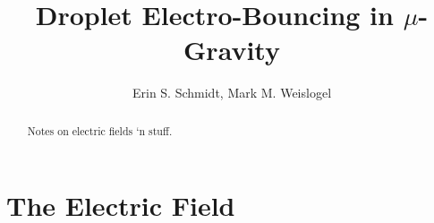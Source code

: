 \documentclass[a4paper, 12pt]{article}
\title{\textsf{\textbf{Droplet Electro-Bouncing in $\mu$-Gravity}}}
\author{Erin S. Schmidt, Mark M. Weislogel}
\date{}
\begin{document}
\maketitle

\begin{abstract}
\noindent
Notes on electric fields `n stuff.
\end{abstract}
\doublespacing
\section{The Electric Field}
\begin{comment}
Being thus armed with the assumption of a purely electrostatic problem (the electric field is conservative, that is $\nabla \times \mathbf{E} = 0$, where $\mathbf{E}$ is the electric field) we can describe the electric field by the Laplace equation for the electric potential. In the case of the volume charge density of the bulk medium to being zero, the divergence of the electric field is zero and we have

\begin{eqnarray}
\mathbf{E} &=& -\nabla \varphi \\
\nabla \cdot \mathbf{E} &=& 0\\
\nabla \cdot \mathbf{E} &=& - \nabla \cdot \nabla \varphi = \nabla^2 \varphi = 0,
\end{eqnarray}
it being convenient to solve the field in terms to $\varphi$ due to the form of the \emph{boundary conditions} usually given by
\begin{enumerate}
\item For finite charge distributions, the potential $\varphi$ goes to zero at infinity, is constant throughout a conductors, and is continuous across physical boundaries.
\item The normal component of the displacement vector $\mathbf{D}$, differs on two sides of a boundary by the free charge density $\rho_f$ residing on the boundary.
\item The tangential component of the field intensity $\mathbf{E}$ is continuous across a boundary.
\end{enumerate}

The in lieu to an analytical solution to Laplace's equation on a dielectric half-space domain by separation of variables or other methods we might try modeling the static charge distribution by a series of Dirac delta funtions after the fasion of a Green's function. In the 2D case we have,
\begin{equation}
\varphi(x,z) = \frac{z}{\pi}\int^\infty_{-\infty} \frac{\rho(x^\prime)}{(x-x^\prime)^2 + z^2}dx^\prime
\end{equation}
\end{comment}
\end{document}
